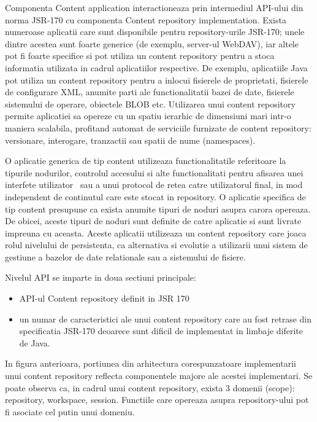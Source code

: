 \bigskip

Componenta Content application interactioneaza prin intermediul API-ului din norma JSR-170 cu componenta Content repository implementation. Exista numeroase aplicatii care sunt disponibile pentru repository{}-urile JSR-170; unele dintre acestea sunt foarte generice (de exemplu, server-ul WebDAV), iar altele pot fi foarte specifice si pot utiliza un content repository pentru a stoca informatia utilizata in cadrul aplicatiilor respective. De exemplu, aplicatiile Java pot utiliza un content repository pentru a inlocui fisierele de proprietati, fisierele de configurare XML, anumite parti ale functionalitatii bazei de date, fisierele sistemului de operare, obiectele BLOB etc. Utilizarea unui content repository permite aplicatiei sa opereze cu un spatiu ierarhic de dimensiuni mari intr-o maniera scalabila, profitand automat de serviciile furnizate de content repository: versionare, interogare, tranzactii sau spatii de nume (namespaces). 

\bigskip

O aplicatie generica de tip content utilizeaza functionalitatile referitoare la tipurile nodurilor, controlul accesului si alte functionalitati pentru afisarea unei interfete utilizator \ sau a unui protocol de retea catre utilizatorul final, in mod independent de continutul care este stocat in repository. O aplicatie specifica de tip content presupune ca exista anumite tipuri de noduri asupra carora opereaza. De obicei, aceste tipuri de noduri sunt definite de catre aplicatie si sunt livrate impreuna cu aceasta. Aceste aplicatii utilizeaza un content repository care joaca rolul nivelului de persistenta, ca alternativa si evolutie a utilizarii unui sistem de gestiune a bazelor de date relationale sau a sistemului de fisiere.

\bigskip

Nivelul API se imparte in doua sectiuni principale:

\begin{itemize}
\item API-ul Content repository definit in JSR 170
\item un numar de caracteristici ale unui content repository care au fost retrase din specificatia JSR-170 deoarece sunt dificil de implementat in limbaje diferite de Java. \ \ \ 
\end{itemize}

\bigskip

In figura anterioara, portiunea din arhitectura corespunzatoare implementarii unui content repository reflecta componentele majore ale acestei implementari. Se poate observa ca, in cadrul unui content repository, exista 3 domenii (scope): repository, workspace, session. Functiile care opereaza asupra repository{}-ului pot fi asociate cel putin unui domeniu.


